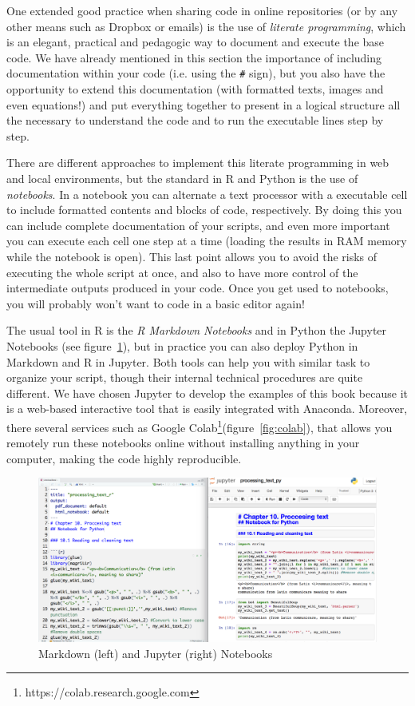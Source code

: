 One extended good practice when sharing code in online repositories (or by any other means such as Dropbox or emails) is the use of \textit{literate programming}, which is an elegant, practical and pedagogic way to document and execute the base code. We have already mentioned in this section the importance of including documentation within your code (i.e. using the \texttt{\#} sign), but you also have the opportunity to extend this documentation (with formatted texts, images and even equations!) and put everything together to present in a logical structure all the necessary to understand the code and to run the executable lines step by step. 

There are different approaches to implement this literate programming in web and local environments, but the standard in R and Python is the use of \textit{notebooks}. In a notebook you can alternate a text processor with a executable cell to include formatted contents and blocks of code, respectively. By doing this you can include complete documentation of your scripts, and even more important you can execute each cell one step at a time (loading the results in RAM memory while the notebook is open). This last point allows you to avoid the risks of executing the whole script at once, and also to have more control of the intermediate outputs produced in your code. Once you get used to notebooks, you will probably won't want to code in a basic editor again!

The usual tool in R is the \textit{R Markdown Notebooks} and in Python the Jupyter Notebooks (see figure~\ref{fig:notebooks}), but in practice you can also deploy Python in Markdown and R in Jupyter. Both tools can help you with similar task to organize your script, though their internal technical procedures are quite different. We have chosen Jupyter to develop the examples of this book because it is a web-based interactive tool that is easily integrated with Anaconda. Moreover, there several services such as Google Colab\footnote{https://colab.research.google.com}(figure~\ref{fig:colab}), that allows you remotely run these notebooks online without installing anything in your computer, making the code highly reproducible.

\begin{figure}
\centering
\includegraphics[width=0.9\linewidth]{figures/ch04_notebooks}
\caption{Markdown (left) and Jupyter (right) Notebooks}
\label{fig:notebooks}
\end{figure}

